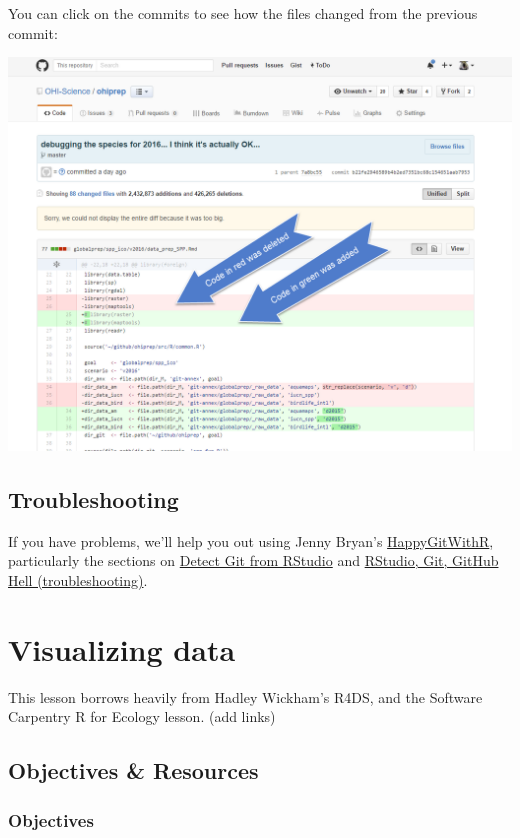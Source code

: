 \documentclass[]{book}
\theoremstyle{definition}
\theoremstyle{definition}
\theoremstyle{definition}
\theoremstyle{remark}
\begin{document}
You can click on the commits to see how the files changed from the
previous commit:

\includegraphics{img/commit_compare_3.png}

\section{Troubleshooting}\label{troubleshooting-1}

If you have problems, we'll help you out using Jenny Bryan's
\href{http://happygitwithr.com}{HappyGitWithR}, particularly the
sections on \href{http://happygitwithr.com/rstudio-see-git.html}{Detect
Git from RStudio} and
\href{http://happygitwithr.com/troubleshooting.html}{RStudio, Git,
GitHub Hell (troubleshooting)}.

\chapter{Visualizing data}\label{viz}

This lesson borrows heavily from Hadley Wickham's R4DS, and the Software
Carpentry R for Ecology lesson. (add links)

\section{Objectives \& Resources}\label{objectives-resources-1}

\subsection{Objectives}\label{objectives-1}
\end{document}
